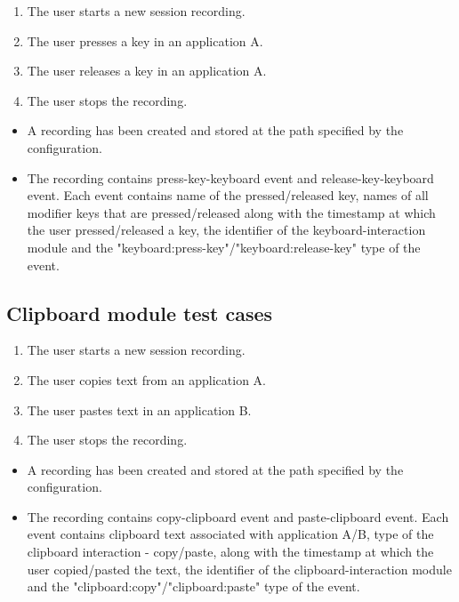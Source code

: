 \begin{tests}
	{\begin{enumerate}
		\item The user starts a new session recording.
		\item The user presses a key in an application A.
		\item The user releases a key in an application A.
		\item The user stops the recording.
	\end{enumerate}}
	{\begin{itemize}
		\item A recording has been created and stored at the path specified by the configuration.
		\item The recording contains press-key-keyboard event and release-key-keyboard event. Each event contains name of the pressed/released key, names of all modifier keys that are pressed/released along with the timestamp at which the user pressed/released a key, the identifier of the keyboard-interaction module and the "keyboard:press-key"/"keyboard:release-key" type of the event.
	\end{itemize}}
\end{tests}

\subsection{Clipboard module test cases}

\begin{tests}
	{\begin{enumerate}
		\item The user starts a new session recording.
		\item The user copies text from an application A.
		\item The user pastes text in an application B.
		\item The user stops the recording.
	\end{enumerate}}
	{\begin{itemize}
		\item A recording has been created and stored at the path specified by the configuration.
		\item The recording contains copy-clipboard event and paste-clipboard event. Each event contains clipboard text associated with application A/B, type of the clipboard interaction - copy/paste, along with the timestamp at which the user copied/pasted the text, the identifier of the clipboard-interaction module and the "clipboard:copy"/"clipboard:paste" type of the event.
	\end{itemize}}
\end{tests}
